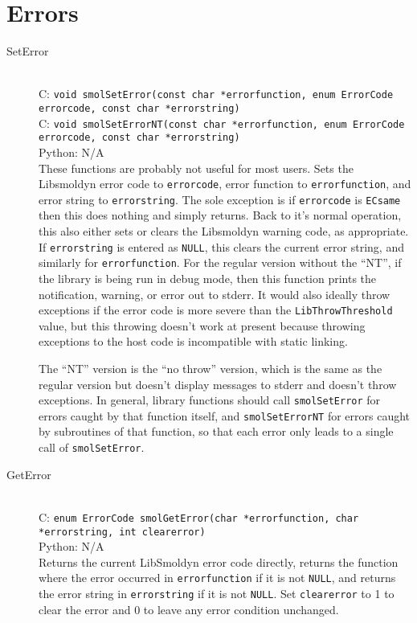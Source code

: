 \documentclass {book}
\newcommand {\ttt} {\texttt}
\begin{document}
\section{Errors}

\begin{description}

\item[SetError]
\hfill \\
C: \ttt{void smolSetError(const char *errorfunction, enum ErrorCode errorcode, const char *errorstring)}\\
C: \ttt{void smolSetErrorNT(const char *errorfunction, enum ErrorCode errorcode, const char *errorstring)}\\
Python: N/A\\
These functions are probably not useful for most users. Sets the Libsmoldyn error code to \ttt{errorcode}, error function to \ttt{errorfunction}, and error string to \ttt{errorstring}. The sole exception is if \ttt{errorcode} is \ttt{ECsame} then this does nothing and simply returns. Back to it's normal operation, this also either sets or clears the Libsmoldyn warning code, as appropriate. If \ttt{errorstring} is entered as \ttt{NULL}, this clears the current error string, and similarly for \ttt{errorfunction}. For the regular version without the ``NT'', if the library is being run in debug mode, then this function prints the notification, warning, or error out to stderr. It would also ideally throw exceptions if the error code is more severe than the \ttt{LibThrowThreshold} value, but this throwing doesn't work at present because throwing exceptions to the host code is incompatible with static linking.

The ``NT'' version is the ``no throw'' version, which is the same as the regular version but doesn't display messages to stderr and doesn't throw exceptions. In general, library functions should call \ttt{smolSetError} for errors caught by that function itself, and \ttt{smolSetErrorNT} for errors caught by subroutines of that function, so that each error only leads to a single call of \ttt{smolSetError}.

\item[GetError]
\hfill \\
C: \ttt{enum ErrorCode smolGetError(char *errorfunction, char *errorstring, int clearerror)}\\
Python: N/A\\
Returns the current LibSmoldyn error code directly, returns the function where the error occurred in \ttt{errorfunction} if it is not \ttt{NULL}, and returns the error string in \ttt{errorstring} if it is not \ttt{NULL}. Set \ttt{clearerror} to 1 to clear the error and 0 to leave any error condition unchanged.


\end{description}
\end{document}
